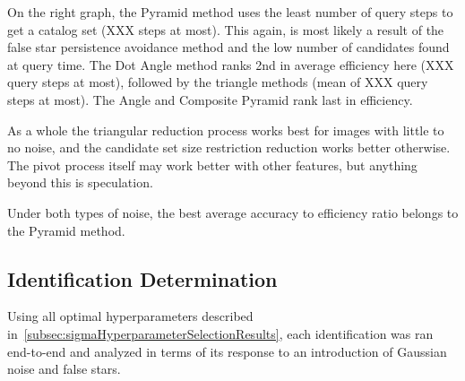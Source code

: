On the right graph, the Pyramid method uses the least number of query steps to get a catalog set (XXX steps at most).
This again, is most likely a result of the false star persistence avoidance method and the low number of candidates
found at query time.
The Dot Angle method ranks 2nd in average efficiency here (XXX query steps at most), followed by the triangle methods
(mean of XXX query steps at most).
The Angle and Composite Pyramid rank last in efficiency.

As a whole the triangular reduction process works best for images with little to no noise, and the candidate set size
restriction reduction works better otherwise.
The pivot process itself may work better with other features, but anything beyond this is speculation.

Under both types of noise, the best average accuracy to efficiency ratio belongs to the Pyramid method.

\subsection{Identification Determination}\label{subsec:identificationDeterminationResults}
Using all optimal hyperparameters described in~\autoref{subsec:sigmaHyperparameterSelectionResults}, each identification
was ran end-to-end and analyzed in terms of its response to an introduction of Gaussian noise and false stars.

\begin{figure}
\end{figure}


